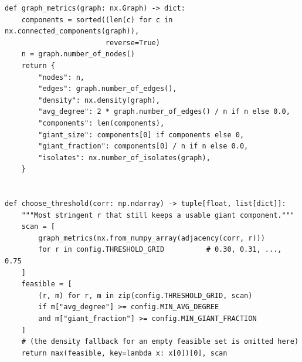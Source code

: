 \begin{lstlisting}[style=python]
def graph_metrics(graph: nx.Graph) -> dict:
    components = sorted((len(c) for c in nx.connected_components(graph)),
                        reverse=True)
    n = graph.number_of_nodes()
    return {
        "nodes": n,
        "edges": graph.number_of_edges(),
        "density": nx.density(graph),
        "avg_degree": 2 * graph.number_of_edges() / n if n else 0.0,
        "components": len(components),
        "giant_size": components[0] if components else 0,
        "giant_fraction": components[0] / n if n else 0.0,
        "isolates": nx.number_of_isolates(graph),
    }


def choose_threshold(corr: np.ndarray) -> tuple[float, list[dict]]:
    """Most stringent r that still keeps a usable giant component."""
    scan = [
        graph_metrics(nx.from_numpy_array(adjacency(corr, r)))
        for r in config.THRESHOLD_GRID          # 0.30, 0.31, ..., 0.75
    ]
    feasible = [
        (r, m) for r, m in zip(config.THRESHOLD_GRID, scan)
        if m["avg_degree"] >= config.MIN_AVG_DEGREE
        and m["giant_fraction"] >= config.MIN_GIANT_FRACTION
    ]
    # (the density fallback for an empty feasible set is omitted here)
    return max(feasible, key=lambda x: x[0])[0], scan
\end{lstlisting}
